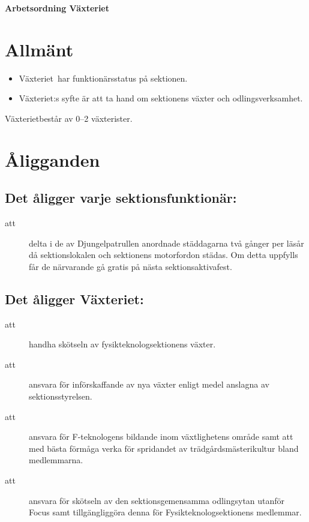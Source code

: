 
\renewcommand{\dateseparator}{-} %

\renewcommand{\forening}{Växteriet}

\begin{center}
\LARGE{\textbf{Arbetsordning \forening}}
\end{center}

\section{Allmänt}
\begin{itemize}
\item \forening \ har funktionärsstatus på sektionen.

\item \forening:s syfte är att ta hand om sektionens växter och odlingsverksamhet.

\end{itemize}

\forening består av 0--2 växterister.

\section{Åligganden}
\subsection{Det åligger varje sektionsfunktionär:}
    \begin{description}
      \item[att] delta i de av Djungelpatrullen anordnade städdagarna två gånger per
      läsår då sektionslokalen och sektionens motorfordon städas. Om detta uppfylls får de närvarande gå gratis på nästa
      sektionsaktivafest.
    \end{description}

\subsection{Det åligger Växteriet:}
    \begin{description}
      \item[att] handha skötseln av fysikteknologsektionens växter.
      \item[att] ansvara för införskaffande av nya växter enligt medel
      anslagna av sektionsstyrelsen.
      \item[att] ansvara för F-teknologens bildande inom växtlighetens
      område samt att med bästa förmåga verka för spridandet av
      träd\-gårds\-mästeri\-kultur bland medlemmarna.
      \item[att]  ansvara för skötseln av den sektionsgemensamma odlingsytan utanför Focus samt tillgängliggöra denna för
      Fysikteknologsektionens medlemmar.
    \end{description}


